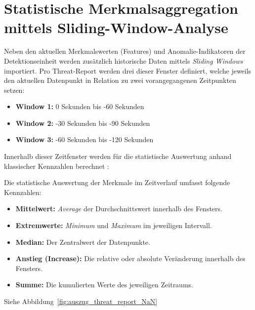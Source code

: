     \section{Statistische Merkmalsaggregation mittels Sliding-Window-Analyse}

    Neben den aktuellen Merkmalswerten (Features) und Anomalie-Indikatoren der Detektionseinheit werden zusätzlich historische Daten mittels \textit{Sliding Windows} importiert. Pro Threat-Report werden drei dieser Fenster definiert, welche jeweils den aktuellen Datenpunkt in Relation zu zwei vorangegangenen Zeitpunkten setzen:

    \begin{itemize}
        \item \textbf{Window 1:} 0 Sekunden bis -60 Sekunden
        \item \textbf{Window 2:} -30 Sekunden bis -90 Sekunden
        \item \textbf{Window 3:} -60 Sekunden bis -120 Sekunden
    \end{itemize}

    Innerhalb dieser Zeitfenster werden für die statistische Auswertung anhand klassischer Kennzahlen berechnet \cite{heigl2021exploiting} \cite{boswell2025flare}:

Die statistische Auswertung der Merkmale im Zeitverlauf umfasst folgende Kennzahlen:
    \begin{itemize}
        \item \textbf{Mittelwert:} \textit{Average} der Durchschnittswert innerhalb des Fensters.
        \item \textbf{Extremwerte:} \textit{Minimum} und \textit{Maximum} im jeweiligen Intervall.
        \item \textbf{Median:} Der Zentralwert der Datenpunkte.
        \item \textbf{Anstieg (Increase):} Die relative oder absolute Veränderung innerhalb des Fensters.
        \item \textbf{Summe:} Die kumulierten Werte des jeweiligen Zeitraums.
    \end{itemize}
    Siehe Abbildung~\ref{fig:auszug_threat_report_NaN}

